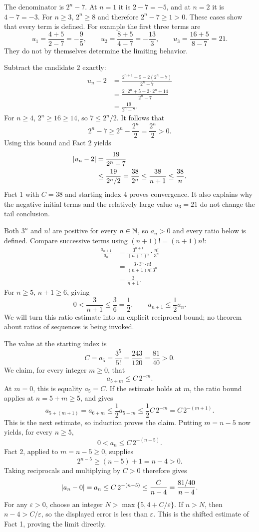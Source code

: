 
The denominator is $2^n-7$. At $n=1$ it
is $2-7=-5$, and at $n=2$ it is $4-7=-3$.
For $n\geq3$, $2^n\geq8$ and therefore $2^n-7\geq1>0$.
These cases show that every term is defined. For example the
first three terms are
\[
 u_1=\frac{4+5}{2-7}=-\frac95,
 \qquad u_2=\frac{8+5}{4-7}=-\frac{13}{3},
 \qquad u_3=\frac{16+5}{8-7}=21.
\]
They do not by themselves determine the limiting behavior.

Subtract the candidate $2$ exactly:
\begin{align*}
 u_n-2
 &=\frac{2^{n+1}+5-2(2^n-7)}{2^n-7}\\
 &=\frac{2\cdot2^n+5-2\cdot2^n+14}{2^n-7}\\
 &=\frac{19}{2^n-7}.
\end{align*}
For $n\geq4$, $2^n\geq16\geq14$, so $7\leq2^n/2$.
It follows that
\[
 2^n-7\geq2^n-\frac{2^n}{2}=\frac{2^n}{2}>0.
\]
Using this bound and Fact 2 yields
\begin{align*}
 \left|u_n-2\right|
 &=\frac{19}{2^n-7}\\
 &\leq\frac{19}{2^n/2}
 =\frac{38}{2^n}
 \leq\frac{38}{n+1}
 \leq\frac{38}{n}.
\end{align*}
Fact 1 with $C=38$ and starting index $4$ proves convergence.
It also explains why the negative initial terms and the relatively
large value $u_3=21$ do not change the tail conclusion.


Both $3^n$ and $n!$ are positive for every $n\in\mathbb{N}$, so
$a_n>0$ and every ratio below is defined. Compare successive
terms using $(n+1)!=(n+1)n!$:
\begin{align*}
 \frac{a_{n+1}}{a_n}
 &=\frac{3^{n+1}}{(n+1)!}\cdot\frac{n!}{3^n}\\
 &=\frac{3\cdot3^n\cdot n!}{(n+1)n!\,3^n}\\
 &=\frac3{n+1}.
\end{align*}
For $n\geq5$, $n+1\geq6$, giving
\[
 0<\frac3{n+1}\leq\frac36=\frac12,
 \qquad
 a_{n+1}\leq\frac12a_n.
\]
We will turn this ratio estimate into an explicit reciprocal bound;
no theorem about ratios of sequences is being invoked.

The value at the starting index is
\[
 C=a_5=\frac{3^5}{5!}
 =\frac{243}{120}=\frac{81}{40}>0.
\]
We claim, for every integer $m\geq0$, that
\[
 a_{5+m}\leq C\,2^{-m}.
\]
At $m=0$, this is equality $a_5=C$. If the estimate holds
at $m$, the ratio bound applies at $n=5+m\geq5$, and gives
\[
 a_{5+(m+1)}=a_{6+m}
 \leq\frac12a_{5+m}
 \leq\frac12C\,2^{-m}
 =C\,2^{-(m+1)}.
\]
This is the next estimate, so induction proves the claim.
Putting $m=n-5$ now yields, for every $n\geq5$,
\[
 0<a_n\leq C\,2^{-(n-5)}.
\]
Fact 2, applied to $m=n-5\geq0$, supplies
\[
 2^{n-5}\geq(n-5)+1=n-4>0.
\]
Taking reciprocals and multiplying by $C>0$ therefore gives
\[
 \left|a_n-0\right|=a_n
 \leq C\,2^{-(n-5)}
 \leq\frac{C}{n-4}
 =\frac{81/40}{n-4}.
\]
For any $\varepsilon>0$, choose an integer
$N>\max\{5,4+C/\varepsilon\}$. If $n>N$, then
$n-4>C/\varepsilon$, so the displayed error is less than
$\varepsilon$. This is the shifted estimate of Fact 1, proving
the limit directly.

